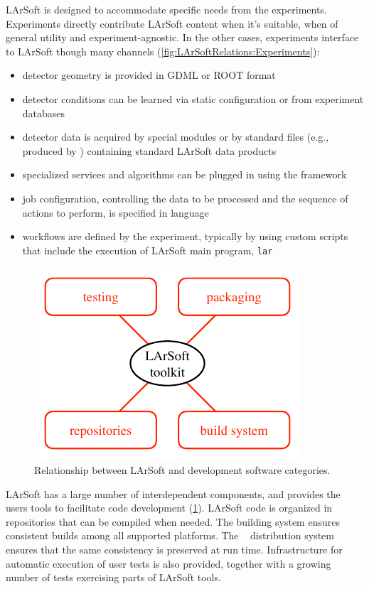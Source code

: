 LArSoft is designed to accommodate specific needs from the experiments.
Experiments directly contribute LArSoft content when it's suitable,
\ie when of general utility and experiment-agnostic.
In the other cases, experiments interface to LArSoft though many channels
(\cref{fig:LArSoftRelations:Experiments}):
\begin{itemize}
   \item detector geometry is provided in GDML or ROOT format
   \item detector conditions can be learned via static configuration or from experiment databases
   \item detector data is acquired by special \ART modules or by standard \ART files (e.g., produced by \ARTDAQ) containing standard LArSoft data products
   \item specialized services and algorithms can be plugged in using the \ART framework
   \item job configuration, controlling the data to be processed and the sequence of actions to perform,
      is specified in \FHiCL language~\cite{FHiCL}
   \item workflows are defined by the experiment, typically by using custom scripts that include the execution of LArSoft main program, \texttt{lar}
\end{itemize}
\begin{figure}
   \centering\includegraphics{figures/LArSoftDevelopmentRunTime}
   \caption{\label{fig:LArSoftRelations:Development}
      Relationship between LArSoft and development software categories.
   }
\end{figure}

LArSoft has a large number of interdependent components,
and provides the users tools to facilitate code development (\cref{fig:LArSoftRelations:Development}).
LArSoft code is organized in repositories that can be compiled when needed.
The building system ensures consistent builds among all supported platforms.
The \UPS~\cite{UPS} distribution system ensures that the same consistency is preserved at run time.
Infrastructure for automatic execution of user tests is also provided,
together with a growing number of tests exercising parts of LArSoft tools.



